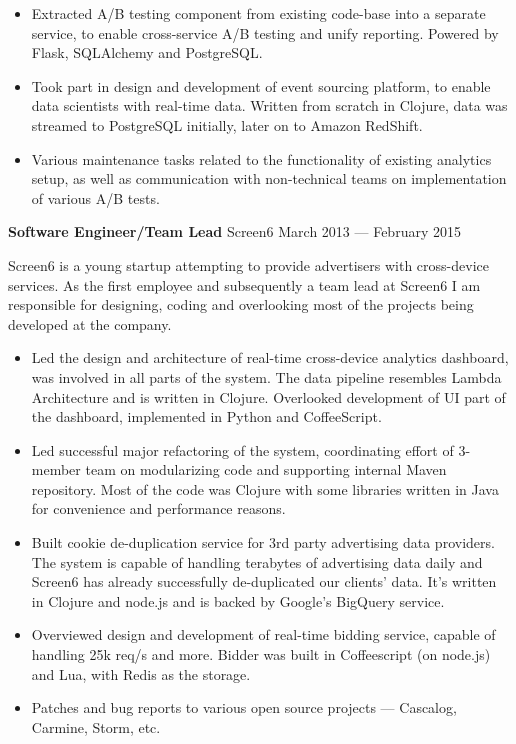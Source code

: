 \documentclass[margin]{res}
\begin{document}
\begin{resume}
\begin{itemize} \itemsep -1pt
\item Extracted A/B testing component from existing code-base into a
  separate service, to enable cross-service A/B testing and unify
  reporting. Powered by Flask, SQLAlchemy and PostgreSQL.
\item Took part in design and development of event sourcing platform,
  to enable data scientists with real-time data. Written from scratch
  in Clojure, data was streamed to PostgreSQL initially, later on to
  Amazon RedShift.
\item Various maintenance tasks related to the functionality of
  existing analytics setup, as well as communication with
  non-technical teams on implementation of various A/B tests.
\end{itemize}

{\bf Software Engineer/Team Lead} Screen6 \hfill March 2013 --- February 2015

Screen6 is a young startup attempting to provide advertisers with
cross-device services. As the first employee and subsequently a team
lead at Screen6 I am responsible for designing, coding and overlooking
most of the projects being developed at the company.\\

\begin{itemize} \itemsep -1pt
\item Led the design and architecture of real-time cross-device
  analytics dashboard, was involved in all parts of the system. The
  data pipeline resembles Lambda Architecture and is written in
  Clojure. Overlooked development of UI part of the dashboard,
  implemented in Python and CoffeeScript.
\item Led successful major refactoring of the system, coordinating
  effort of 3-member team on modularizing code and supporting internal
  Maven repository. Most of the code was Clojure with some libraries
  written in Java for convenience and performance reasons.
\item Built cookie de-duplication service for 3rd party advertising
  data providers. The system is capable of handling terabytes of
  advertising data daily and Screen6 has already successfully
  de-duplicated our clients' data. It's written in Clojure and node.js
  and is backed by Google's BigQuery service.
\item Overviewed design and development of real-time bidding service,
  capable of handling 25k req/s and more. Bidder was built in
  Coffeescript (on node.js) and Lua, with Redis as the storage.
\item Patches and bug reports to various open source projects ---
  Cascalog, Carmine, Storm, etc.
\end{itemize}


\end{resume}
\end{document}
